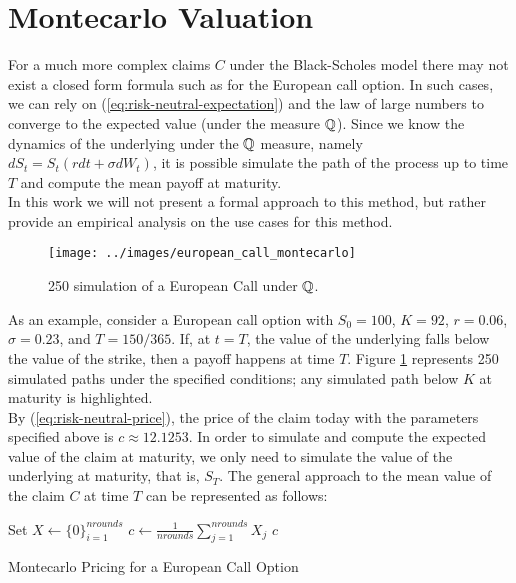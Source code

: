 \documentclass[../TGMAFFIRO.tex]{subfiles}
\begin{document}
\section{Montecarlo Valuation}
For a much more complex claims $C$ under the Black-Scholes model there may not exist a closed form formula such as for the European call option. In such cases, we can rely on (\ref{eq:risk-neutral-expectation}) and the law of large numbers to converge to the expected value (under the measure $\mathbb{Q}$). Since we know the dynamics of the underlying under the $\mathbb{Q}$ measure, namely $dS_t = S_t\left(rdt + \sigma dW_t\right)$, it is possible simulate the path of the process up to time $T$ and compute the mean payoff at maturity.\\

In this work we will not present a formal approach to this method, but rather provide an empirical analysis on the use cases for this method.\\

\begin{figure}[h!]
  \texttt{[image: ../images/european\_call\_montecarlo]}
  \label{fig:montecarlo_simulation}
  \caption{250 simulation of a European Call under $\mathbb{Q}$.}
\end{figure}


As an example, consider a European call option with $S_0 = 100$, $K = 92$, $r = 0.06$, $\sigma = 0.23$, and $T = 150 / 365$. If, at $t=T$, the value of the underlying falls below the value of the strike, then a payoff happens at time $T$. Figure \ref{fig:montecarlo_simulation} represents 250 simulated paths under the specified conditions; any simulated path below $K$ at maturity is highlighted.\\

By (\ref{eq:risk-neutral-price}), the price of the claim today with the parameters specified above is $c\approx 12.1253$. In order to simulate and compute the expected value of the claim at maturity, we only need to simulate the value of the underlying at maturity, that is, $S_T$. The general approach to the mean value of the claim $C$ at time $T$ can be represented as follows:\\

\begin{algorithm}[H]
	\SetAlgoLined
	Set $X \leftarrow \{0\}_{i=1}^{nrounds}$\;
	$c \leftarrow \frac{1}{nrounds} \sum_{j=1}^{nrounds}X_j$\;
	\Return $c$\;
	\caption{Montecarlo Pricing for a European Call Option}
\end{algorithm}
\end{document}
